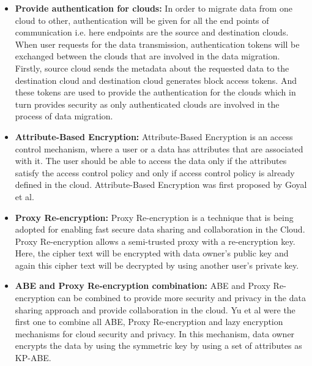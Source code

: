 \documentclass[11pt, pdftex, conference]{IEEEtran}
\begin{document}
\begin{itemize}
\item{\textbf{Provide authentication for clouds:}}
In order to migrate data from one cloud to other, authentication will be given for all the end points of communication i.e. here endpoints are the source and destination clouds\cite{3}. When user requests for the data transmission, authentication tokens will be exchanged between the clouds that are involved in the data migration. Firstly, source cloud sends the metadata about the requested data to the destination cloud and destination cloud generates block access tokens. And these tokens are used to provide the authentication for the clouds which in turn provides security as only authenticated clouds are involved in the process of data migration. 
\end{itemize}
\begin{itemize}
\item{\textbf{Attribute-Based Encryption:}}
Attribute-Based Encryption is an access control mechanism, where a user or a data has attributes that are associated with it. The user should be able to access the data only if the attributes satisfy the access control policy and only if access control policy is already defined in the cloud. Attribute-Based Encryption was first proposed by Goyal et al. \cite{6}
\end{itemize}

\begin{itemize}
\item{\textbf{Proxy Re-encryption:}}
Proxy Re-encryption is a technique that is being adopted for enabling fast secure data sharing and collaboration in the Cloud. Proxy Re-encryption \cite{7} allows a semi-trusted proxy with a re-encryption key. Here, the cipher text will be encrypted with data owner’s public key and again this cipher text will be decrypted by using another user’s private key.
\end{itemize}

\begin{itemize}
\item{\textbf{ABE and Proxy Re-encryption combination:}}
ABE and Proxy Re-encryption can be combined to provide more security and privacy in the data sharing approach and provide collaboration in the cloud. Yu et al \cite{8} were the first one to combine all ABE, Proxy Re-encryption and lazy encryption mechanisms for cloud security and privacy. In this mechanism, data owner encrypts the data by using the symmetric key by using a set of attributes as KP-ABE.
\end{itemize}
\end{document}
